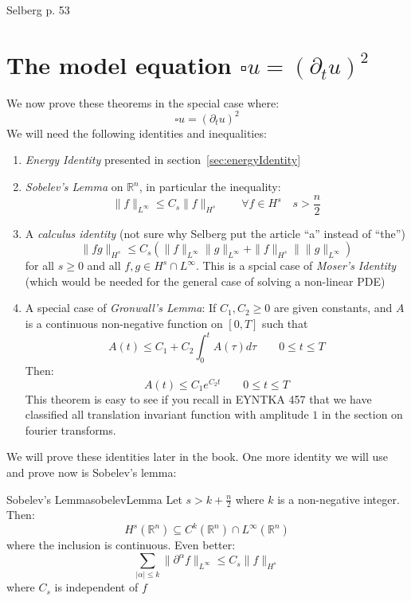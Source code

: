 \documentclass{book}
\newenvironment{Proof}[1][]
  {\begin{ProofTcb}[#1]}
  {\end{ProofTcb}}
\newcommand{\R}{{\mathbb{R}}}
\newcommand{\sse}{\subseteq}
\begin{document}
\begin{Proof}
	Selberg p. 53
\end{Proof}

\section[The model non-linear PDE]{The model equation $\square u = (  \partial_tu )^2$}\label{sec:modelnonLinPDE}

We now prove these theorems in the special case where:
\[
	\square u =  (\partial_t u)^2
\]
We will need the following identities and inequalities:
\begin{enumerate}
	\item \emph{Energy Identity} presented in section~\ref{sec:energyIdentity}
	\item \emph{Sobelev's Lemma} on $\R^n$, in particular the inequality:
		\[
			\|f\|_{L^\infty} \le C_s \|f\|_{H^s} \qquad \forall f \in H^s \quad s > \frac{n}{2}
		\]
	\item A \emph{calculus identity} (not sure why Selberg put the article ``a'' instead of ``the'')
		\[
			\|fg\|_{H^s} \le C_s(\|f\|_{L^\infty}\|g\|_{L^\infty} + \|f\|_{H^s}\|\|g\|_{L^\infty})
		\]
		for all $s \ge 0$ and all $f,g \in H^s\cap L^\infty$. This is a spcial case of \emph{Moser's Identity} (which
		would be needed for the general case of solving a non-linear PDE)
	\item A special case of \emph{Gronwall's Lemma}: If $C_1, C_2 \ge 0$ are given constants, and $A$ is a continuous
		non-negative function on $[0,T]$ such that
		\[
			A(t) \le C_1 + C_2\int_0^t A(\tau)d\tau \qquad 0\le t \le T
		\]
		Then:
		\[
			A(t) \le C_1e^{C_2t} \qquad 0 \le t \le T
		\]
		This theorem is easy to see if you recall in EYNTKA 457 that we have classified all translation invariant
		function with amplitude $1$ in the section on fourier transforms.

\end{enumerate}

We will prove these identities later in the book. One more identity we will use and prove now is Sobelev's lemma:
\begin{thm}{Sobelev's Lemma}{sobelevLemma}
	Let $s > k + \frac{n}{2}$ where $k$ is a non-negative integer. Then:
	\[
		H^s(\R^n) \sse C^k(\R^n)\cap L^\infty(\R^n)
	\]
	where the inclusion is continuous. Even better:
	\[
		\sum_{|\alpha| \le k} \|  \partial^\alpha f\|_{L^\infty} \le C_s \|f\|_{H^s}
	\]
	where $C_s$ is independent of $f$
\end{thm}
\end{document}
